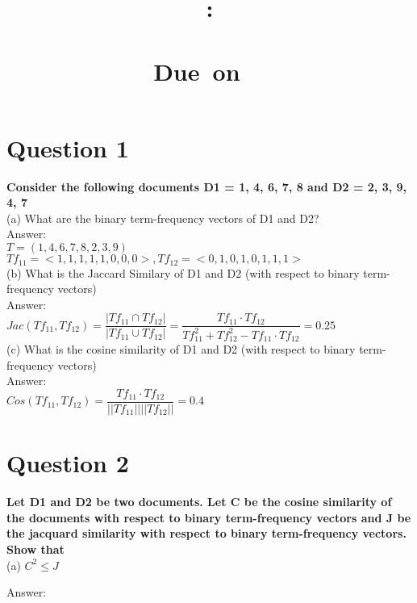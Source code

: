 \documentclass{article}
\title{
    \vspace{2in}
    \textmd{\textbf{\hmwkClass:\\\ \hmwkTitle}}\\
    \normalsize\vspace{0.1in}\small{Due\ on\ \hmwkDueDate\ }\\
    \vspace{0.1in}\large{\textit{\hmwkClassInstructor}}
    \vspace{3in}
}
\author{\textbf{\hmwkAuthorName}}
\date{}
\begin{document}
\maketitle
\newpage
\tableofcontents
\newpage
\section{Question 1}
\textbf{Consider the following documents D1 = {1, 4, 6, 7, 8} and D2 = {2, 3, 9, 4, 7}}\\

(a) What are the binary term-frequency vectors of D1 and D2? \\

Answer:\\

$T = (1,4,6,7,8,2,3,9)$\\

$Tf_{11} = <1,1,1,1,1,0,0,0>, Tf_{12} = <0,1,0,1,0,1,1,1>$ \\

(b) What is the Jaccard Similary of D1 and D2 (with respect to binary term-frequency
vectors)\\

Answer:\\

$Jac(Tf_{11}, Tf_{12}) = \dfrac{|Tf_{11} \cap Tf_{12} |}{|Tf_{11} \cup Tf_{12}|} = \dfrac{Tf_{11} \cdot Tf_{12}}{Tf_{11}^{2}+Tf_{12}^{2}-Tf_{11} \cdot Tf_{12}} = 0.25$\\

(c) What is the cosine similarity of D1 and D2 (with respect to binary term-frequency
vectors)\\

Answer:\\

$Cos(Tf_{11}, Tf_{12})  = \dfrac{Tf_{11} \cdot Tf_{12}}{||Tf_{11}|| ||Tf_{12}||} = 0.4$


\clearpage 


\section{Question 2}
\textbf{Let D1 and D2 be two documents. Let C be the cosine similarity of the documents with
respect to binary term-frequency vectors and J be the jacquard similarity with respect to
binary term-frequency vectors. Show that}\\

(a) $C^{2} \leq J$

Answer:\\
\end{document}
